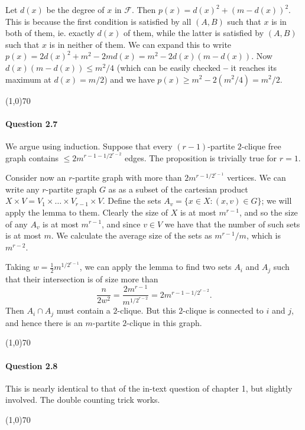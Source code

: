 Let $d(x)$ be the degree of $x$ in $\mathcal{F}$. Then $p(x)=d(x)^2 + (m-d(x))^2$. This is because the first condition is satisfied by all $(A,B)$ such that $x$ is in both of them, ie. exactly $d(x)$ of them, while the latter is satisfied by $(A,B)$ such that $x$ is in neither of them. We can expand this to write $p(x) = 2d(x)^2 + m^2 - 2md(x) = m^2 - 2d(x)(m-d(x))$. Now $d(x)(m-d(x))\leq m^2/4$ (which can be easily checked \textbf{--} it reaches its maximum at $d(x)=m/2$) and we have $p(x)\geq m^2-2(m^2/4)=m^2/2$.

\begin{center}
	\line(1,0){70}
\end{center}

\paragraph{Question 2.7} We argue using induction. Suppose that every $(r-1)$-partite $2$-clique free graph contains $\leq 2m^{r-1-1/2^{r-2}}$ edges. The proposition is trivially true for $r=1$.

Consider now an $r$-partite graph with more than $2m^{r-1/2^{r-1}}$ vertices. We can write any $r$-partite graph $G$ as as a subset of the cartesian product $X \times V = V_1\times\dots\times V_{r-1}\times V$. Define the sets $A_v=\{x\in X:(x,v)\in G\}$; we will apply the lemma to them. Clearly the size of $X$ is at most $m^{r-1}$, and so the size of any $A_v$ is at most $m^{r-1}$, and since $v\in V$ we have that the number of such sets is at most $m$. We calculate the average size of the sets as $m^{r-1}/m$, which is $m^{r-2}$. 

Taking $w=\frac{1}{2}m^{1/2^{r-1}}$, we can apply the lemma to find two sets $A_i$ and $A_j$ such that their intersection is of size more than
$$\frac{n}{2w^{2}}=\frac{2m^{r-1}}{m^{1/2^{r-2}}}=2m^{r-1-1/2^{r-2}}.$$
Then $A_i\cap A_j$ must contain a $2$-clique. But this $2$-clique is connected to $i$ and $j$, and hence there is an $m$-partite $2$-clique in this graph.

\begin{center}
	\line(1,0){70}
\end{center}

\paragraph{Question 2.8} This is nearly identical to that of the in-text question of chapter 1, but slightly involved. The double counting trick works.

\begin{center}
	\line(1,0){70}
\end{center}